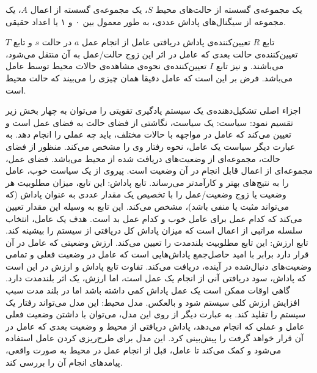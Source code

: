  یک مجموعه‌ی گسسته از حالت‌های محیط $S$،
 یک مجموعه‌ی گسسته از اعمال $A$،
 یک مجموعه از سیگنال‌های پاداش عددی، به طور معمول بین ۰ و ۱ یا اعداد حقیقی.

تابع $R$ تعیین‌کننده‌ی پاداش دریافتی عامل از انجام عمل $a$ در حالت $s$ و تابع $T$ تعیین‌کننده‌ی حالت
بعدی که عامل در اثر این زوج حالت/عمل به آن منتقل می‌شود، می‌باشند. و نیز تابع $I$ تعیین‌کننده‌ی نحوه‌ی مشاهده‌ی حالات محیط توسط عامل می‌باشد. فرض بر این است که عامل
دقیقا همان چیزی را می‌بیند که حالت محیط است.

اجزاء اصلی تشکیل‌دهنده‌ی یک سیستم یادگیری تقویتی را می‌توان به چهار بخش زیر تقسیم نمود:
 سیاست:
یک سیاست، نگاشتی از فضای حالت به فضای عمل است و تعیین می‌کند که عامل در
مواجهه با حالات مختلف، باید چه عملی را انجام دهد. به عبارت دیگر سیاست یک عامل، نحوه 
رفتار وی را مشخص می‌کند. منظور از فضای حالت، مجموعه‌ای از وضعیت‌های دریافت شده از محیط می‌باشد. فضای عمل، مجموعه‌ای از اعمال قابل انجام در آن وضعیت است. پیروی از یک
سیاست خوب، عامل را به نتیج‌های بهتر و کارآمدتر می‌رساند.
 تابع پاداش:
این تابع، میزان مطلوبیت هر وضعیت یا زوج وضعیت/عمل را با تخصیص یک مقدار
عددی به عنوان پاداش (که می‌تواند مثبت یا منفی باشد)، مشخص می‌کند. این تابع به وسیله این  مقدار تعیین می‌کند که کدام عمل برای عامل خوب و کدام عمل بد است. هدف یک عامل، انتخاب
سلسله مراتبی از اعمال است که میزان پاداش کل دریافتی از سیستم را بیشینه کند.
 تابع ارزش:
این تابع مطلوبیت بلندمدت را تعیین می‌کند. ارزش وضعیتی که عامل در آن قرار دارد
برابر با امید حاصل‌جمع پاداش‌هایی است که عامل در وضعیت فعلی و تمامی وضعیت‌های دنبال‌شده
 در آینده، دریافت می‌کند. تفاوت تابع پاداش و ارزش در این است که پاداش، سود دریافتی آنی از انجام یک عمل است، اما ارزش، یک اثر بلندمدت دارد. گاهی اوقات ممکن است یک عمل پاداش
کمی داشته باشد اما در بلند مدت سبب افزایش ارزش کلی سیستم شود و بالعکس.
 مدل محیط:
این مدل می‌تواند رفتار یک سیستم را تقلید کند. به عبارت دیگر از روی این مدل،
می‌توان با داشتن وضعیت فعلی عامل و عملی که انجام می‌دهد، پاداش دریافتی از محیط و وضعیت  بعدی که عامل در آن قرار خواهد گرفت را پیش‌بینی کرد. این مدل برای طرح‌ریزی کردن عامل استفاده می‌شود و کمک می‌کند تا عامل، قبل از انجام عمل در محیط به صورت واقعی، پیامدهای
انجام آن را بررسی کند.






